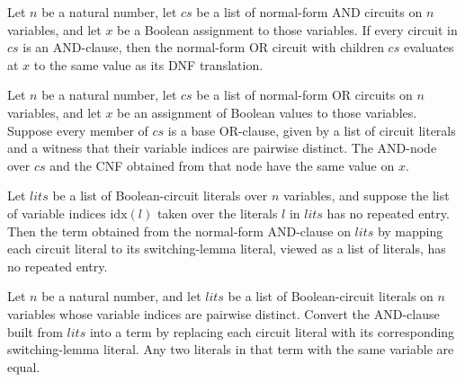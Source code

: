 \begin{theorem}
\label{BoolCircuit.NOrCircuit.node_eval_eq_toDNF_eval}
\leanok
{}
Let $n$ be a natural number, let $cs$ be a list of normal-form AND circuits on $n$
variables, and let $x$ be a Boolean assignment to those variables. If every circuit in
$cs$ is an AND-clause, then the normal-form OR circuit with children $cs$ evaluates at
$x$ to the same value as its DNF translation.
\end{theorem}

\begin{theorem}
\label{BoolCircuit.NAndCircuit.node_eval_eq_toCNF_eval}
\leanok
{}
Let $n$ be a natural number, let $cs$ be a list of normal-form OR circuits on $n$
variables, and let $x$ be an assignment of Boolean values to those variables. Suppose
every member of $cs$ is a base OR-clause, given by a list of circuit literals and a
witness that their variable indices are pairwise distinct. The AND-node over $cs$ and
the CNF obtained from that node have the same value on $x$.
\end{theorem}

\begin{theorem}
\label{BoolCircuit.NAndCircuit.clauseToTerm_nodup}
\leanok
{}
Let $lits$ be a list of Boolean-circuit literals over $n$ variables, and suppose the
list of variable indices $\mathrm{idx}(l)$ taken over the literals $l$ in $lits$ has no
repeated entry. Then the term obtained from the normal-form AND-clause on $lits$ by
mapping each circuit literal to its switching-lemma literal, viewed as a list of
literals, has no repeated entry.
\end{theorem}

\begin{theorem}
\label{BoolCircuit.NAndCircuit.clauseToTerm_var_inj}
\leanok
{}
Let $n$ be a natural number, and let $lits$ be a list of Boolean-circuit literals on $n$
variables whose variable indices are pairwise distinct. Convert the AND-clause built
from $lits$ into a term by replacing each circuit literal with its corresponding
switching-lemma literal. Any two literals in that term with the same variable are equal.
\end{theorem}

